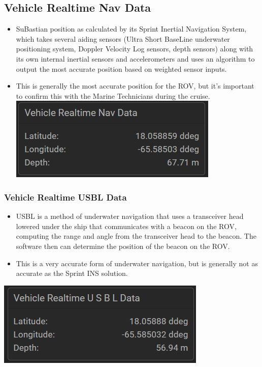 \documentclass[
  letterpaper,
  DIV=11,
  numbers=noendperiod]{scrreprt}
\providecommand{\tightlist}{%
  \setlength{\itemsep}{0pt}\setlength{\parskip}{0pt}}\usepackage{longtable,booktabs,array}
\begin{document}
\hypertarget{vehicle-realtime-nav-data}{%
\subsection{Vehicle Realtime Nav Data}\label{vehicle-realtime-nav-data}}

\begin{itemize}
\tightlist
\item
  SuBastian position as calculated by its Sprint Inertial Navigation
  System, which takes several aiding sensors (Ultra Short BaseLine
  underwater positioning system, Doppler Velocity Log sensors, depth
  sensors) along with its own internal inertial sensors and
  accelerometers and uses an algorithm to output the most accurate
  position based on weighted sensor inputs.
\item
  This is generally the most accurate position for the ROV, but it's
  important to confirm this with the Marine Technicians during the
  cruise. \includegraphics{images/image17.png}
\end{itemize}

\hypertarget{vehicle-realtime-usbl-data}{%
\subsubsection{Vehicle Realtime USBL
Data}\label{vehicle-realtime-usbl-data}}

\begin{itemize}
\tightlist
\item
  USBL is a method of underwater navigation that uses a transceiver head
  lowered under the ship that communicates with a beacon on the ROV,
  computing the range and angle from the transceiver head to the beacon.
  The software then can determine the position of the beacon on the ROV.
\item
  This is a very accurate form of underwater navigation, but is
  generally not as accurate as the Sprint INS solution.
\end{itemize}

\includegraphics{images/image1.png}
\end{document}
